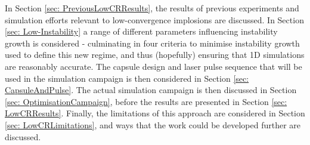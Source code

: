 In Section \ref{sec: PreviousLowCRResults}, the results of previous experiments and simulation efforts relevant to low-convergence implosions are discussed. In Section \ref{sec: Low-Instability} a range of different parameters influencing instability growth is considered - culminating in four criteria to minimise instability growth used to define this new regime, and thus (hopefully) ensuring that 1D simulations are reasonably accurate. The capsule design and laser pulse sequence that will be used in the simulation campaign is then considered in Section \ref{sec: CapsuleAndPulse}. The actual simulation campaign is then discussed in Section \ref{sec: OptimisationCampaign}, before the results are presented in Section \ref{sec: LowCRResults}. Finally, the limitations of this approach are considered in Section \ref{sec: LowCRLimitations}, and ways that the work could be developed further are discussed.





